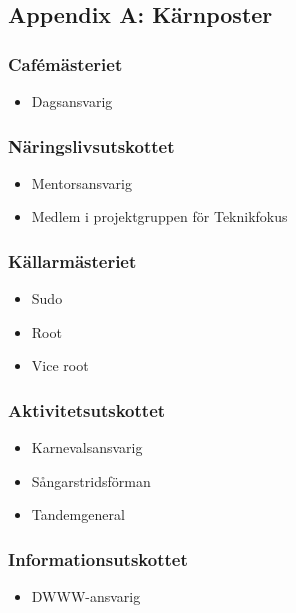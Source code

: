 \documentclass{dsekprotokoll}
\begin{document}
\subsection*{Appendix A: Kärnposter}
\begin{multicols}{2}

    \subsubsection*{Cafémästeriet}
    \begin{itemize}
        \item Dagsansvarig
    \end{itemize}

    \subsubsection*{Näringslivsutskottet}
    \begin{itemize}
        \item Mentorsansvarig
        \item Medlem i projektgruppen för Teknikfokus
    \end{itemize}

    \subsubsection*{Källarmästeriet}
    \begin{itemize}
        \item Sudo
        \item Root
        \item Vice root
    \end{itemize}

    \subsubsection*{Aktivitetsutskottet}
    \begin{itemize}
        \item Karnevalsansvarig
        \item Sångarstridsförman
        \item Tandemgeneral
    \end{itemize}

    \subsubsection*{Informationsutskottet}
    \begin{itemize}
        \item DWWW-ansvarig
    \end{itemize}


\end{multicols}
\end{document}
